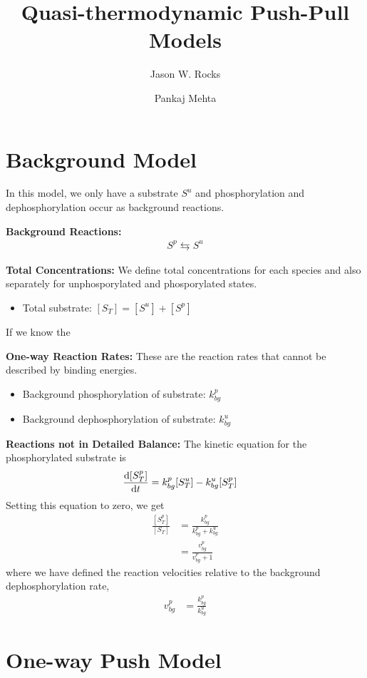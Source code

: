 \documentclass[aps,onecolumn,superscriptaddress,notitlepage]{revtex4-1}
\begin{document}
\title{Quasi-thermodynamic Push-Pull Models}
\author{Jason W. Rocks}
\author{Pankaj Mehta}
\maketitle

\section{Background Model}


In this model, we only have a substrate $S^u$ and
phosphorylation and dephosphorylation occur as background reactions.

\textbf{Background Reactions:}
\begin{gather}
S^p \leftrightarrows S^u
\end{gather}


\textbf{Total Concentrations:}
We define total concentrations for each species and also separately for unphosporylated and phosporylated states.
\begin{itemize}
\item Total substrate: $[S_T] = [S^u] + [S^p]$
\end{itemize}
If we know the 

\textbf{One-way Reaction Rates:}
These are the reaction rates that cannot be described by binding energies.
\begin{itemize}
\item Background phosphorylation of substrate: $k_{bg}^p$
\item Background dephosphorylation of substrate: $k_{bg}^u$
\end{itemize}

\textbf{Reactions not in  Detailed Balance:}
The kinetic equation for the phosphorylated substrate is
\begin{align}
\dv{[S^p_T]}{t} &=k_{bg}^p[S_T^u] - k_{bg}^u[S_T^p]
\end{align}
Setting this equation to zero, we get
\begin{align}
\frac{[S_T^p]}{[S_T]} &= \frac{k_{bg}^p}{k_{bg}^p+k_{bg}^u}\\
& = \frac{v_{bg}^p}{v_{bg}^p+1}
\end{align}
where we have defined the reaction velocities relative to the background dephosphorylation rate,
\begin{align}
v_{bg}^p &= \frac{k_{bg}^p}{k_{bg}^u}
\end{align}


\section{One-way Push Model}
\end{document}
